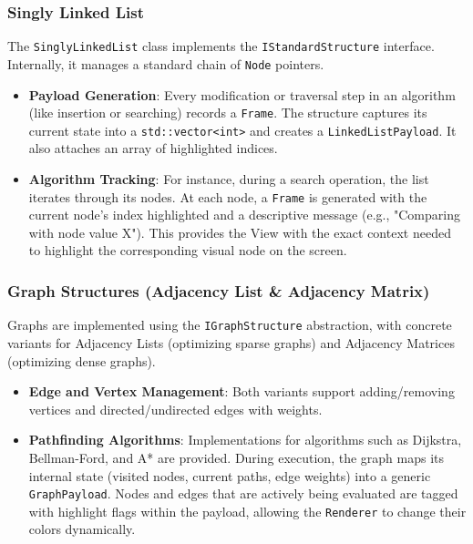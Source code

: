 \subsubsection{Singly Linked List}
The \texttt{SinglyLinkedList} class implements the \texttt{IStandardStructure} interface. Internally, it manages a standard chain of \texttt{Node} pointers.
\begin{itemize}
    \item \textbf{Payload Generation}: Every modification or traversal step in an algorithm (like insertion or searching) records a \texttt{Frame}. The structure captures its current state into a \texttt{std::vector<int>} and creates a \texttt{LinkedListPayload}. It also attaches an array of highlighted indices.
    \item \textbf{Algorithm Tracking}: For instance, during a search operation, the list iterates through its nodes. At each node, a \texttt{Frame} is generated with the current node's index highlighted and a descriptive message (e.g., "Comparing with node value X"). This provides the View with the exact context needed to highlight the corresponding visual node on the screen.
\end{itemize}

\subsubsection{Graph Structures (Adjacency List \& Adjacency Matrix)}
Graphs are implemented using the \texttt{IGraphStructure} abstraction, with concrete variants for Adjacency Lists (optimizing sparse graphs) and Adjacency Matrices (optimizing dense graphs).
\begin{itemize}
    \item \textbf{Edge and Vertex Management}: Both variants support adding/removing vertices and directed/undirected edges with weights.
    \item \textbf{Pathfinding Algorithms}: Implementations for algorithms such as Dijkstra, Bellman-Ford, and A* are provided. During execution, the graph maps its internal state (visited nodes, current paths, edge weights) into a generic \texttt{GraphPayload}. Nodes and edges that are actively being evaluated are tagged with highlight flags within the payload, allowing the \texttt{Renderer} to change their colors dynamically.
\end{itemize}

